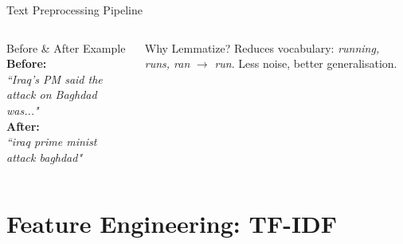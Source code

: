 \documentclass[aspectratio=169,11pt]{beamer}
\begin{document}
\begin{frame}{Text Preprocessing Pipeline}
\begin{columns}[T]
\begin{exampleblock}{Before \& After Example}
      \footnotesize
      \textbf{Before:}\\
      \textit{``Iraq's PM said the attack on Baghdad was..."}\\[4pt]
      \textbf{After:}\\
      \textit{``iraq prime minist attack baghdad"}
    \end{exampleblock}
    \begin{alertblock}{Why Lemmatize?}
      \footnotesize
      Reduces vocabulary: \textit{running, runs, ran} $\to$ \textit{run}. Less noise, better generalisation.
    \end{alertblock}
\end{columns}
\end{frame}

\section{Feature Engineering: TF-IDF}
\end{document}
